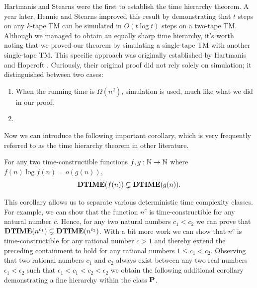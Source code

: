 \documentclass[11pt,twoside=off,numbers=noenddot]{scrbook}
\begin{document}
\begin{remark}
  Hartmanis and Stearns \cite{hartmanis1965computational} were the first to establish the time hierarchy theorem. A year later, Hennie and Stearns \cite{hennie1966two} improved this result by demonstrating that $t$ steps on any $k$-tape TM can be simulated in $O(t \log t)$ steps on a two-tape TM. Although we managed to obtain an equally sharp time hierarchy, it's worth noting that we proved our theorem by simulating a single-tape TM with another single-tape TM. This specific approach was originally established by Hartmanis and Hopcroft \cite{hartmanis1968computational}. Curiously, their original proof did not rely solely on simulation; it distinguished between two cases:
  \begin{enumerate}
    \item When the running time is $\Omega(n^2)$, simulation is used, much like what we did in our proof.
    \item {}
  \end{enumerate}
\end{remark}

Now we can introduce the following important corollary, which is very frequently referred to as the time hierarchy theorem in other literature.

\begin{corollary}
  For any two time-constructible functions $f, g : \mathbb N \to \mathbb N$ where $f(n) \log f(n) = o(g(n))$,
  \[ \textbf{DTIME}(f(n)) \subsetneq \textbf{DTIME}(g(n)). \]
\end{corollary}

This corollary allows us to separate various deterministic time complexity classes. For example, we can show that the function $n^c$ is time-constructible for any natural number $c$. Hence, for any two natural numbers $c_1 < c_2$ we can prove that $\textbf{DTIME}(n^{c_1}) \subsetneq \textbf{DTIME}(n^{c_2})$. With a bit more work we can show that $n^c$ is time-constructible for any rational number $c > 1$ and thereby extend the preceding containment to hold for any rational numbers $1 \leq c_1 < c_2$. Observing that two rational numbers $c_1$ and $c_2$ always exist between any two real numbers $\epsilon_1 < \epsilon_2$ such that $\epsilon_1 < c_1 < c_2 < \epsilon_2$ we obtain the following additional corollary demonstrating a fine hierarchy within the class $\textbf{P}$.
\end{document}
